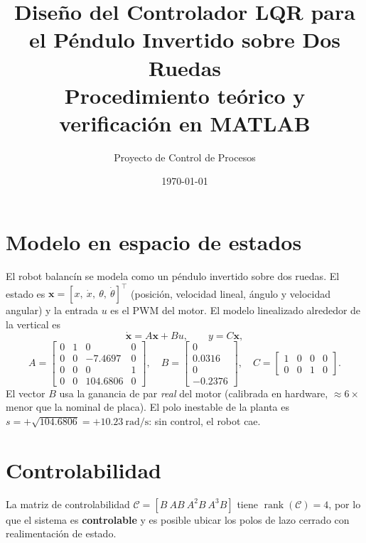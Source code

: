 \documentclass[11pt,a4paper]{article}
\title{\textbf{Dise\~no del Controlador LQR para el P\'endulo Invertido sobre Dos Ruedas}\\
\large Procedimiento te\'orico y verificaci\'on en MATLAB}
\author{Proyecto de Control de Procesos}
\date{\today}
\begin{document}
\maketitle

\section{Modelo en espacio de estados}
El robot balanc\'in se modela como un p\'endulo invertido sobre dos ruedas. El
estado es $\mathbf{x}=[x,\ \dot{x},\ \theta,\ \dot{\theta}]^{\top}$ (posici\'on,
velocidad lineal, \'angulo y velocidad angular) y la entrada $u$ es el PWM del
motor. El modelo linealizado alrededor de la vertical es
\begin{equation}
\dot{\mathbf{x}} = A\mathbf{x} + Bu, \qquad y = C\mathbf{x},
\end{equation}
\begin{equation}
A=\begin{bmatrix} 0&1&0&0\\ 0&0&-7.4697&0\\ 0&0&0&1\\ 0&0&104.6806&0 \end{bmatrix},\quad
B=\begin{bmatrix} 0\\ 0.0316\\ 0\\ -0.2376 \end{bmatrix},\quad
C=\begin{bmatrix}1&0&0&0\\0&0&1&0\end{bmatrix}.
\end{equation}
El vector $B$ usa la ganancia de par \emph{real} del motor (calibrada en
hardware, $\approx 6\times$ menor que la nominal de placa). El polo inestable de
la planta es $s=+\sqrt{104.6806}=+10.23~\mathrm{rad/s}$: sin control, el robot cae.

\section{Controlabilidad}
La matriz de controlabilidad $\mathcal{C}=[B\ AB\ A^2B\ A^3B]$ tiene
$\operatorname{rank}(\mathcal{C})=4$, por lo que el sistema es \textbf{controlable}
y es posible ubicar los polos de lazo cerrado con realimentaci\'on de estado.
\end{document}
